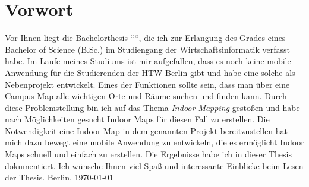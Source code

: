 \chapter*{Vorwort}
Vor Ihnen liegt die Bachelorthesis ``\thetitle``, die ich zur Erlangung des Grades eines Bachelor of Science (B.Sc.) im Studiengang der Wirtschaftsinformatik verfasst habe.
\pbreak
Im Laufe meines Studiums ist mir aufgefallen, dass es noch keine mobile Anwendung für die Studierenden der HTW Berlin gibt und habe eine solche als Nebenprojekt entwickelt. Eines der Funktionen sollte sein, dass man über eine Campus-Map alle wichtigen Orte und Räume suchen und finden kann. Durch diese Problemstellung bin ich auf das Thema \textit{Indoor Mapping} gestoßen und habe nach Möglichkeiten gesucht Indoor Maps für diesen Fall zu erstellen. Die Notwendigkeit eine Indoor Map in dem genannten Projekt bereitzustellen hat mich dazu bewegt eine mobile Anwendung zu entwickeln, die es ermöglicht Indoor Maps schnell und einfach zu erstellen. Die Ergebnisse habe ich in dieser Thesis dokumentiert.
\pbreak
Ich wünsche Ihnen viel Spaß und interessante Einblicke beim Lesen der Thesis.
\pbreak
\theauthor
\pbreak
Berlin, \today
\clearpage
